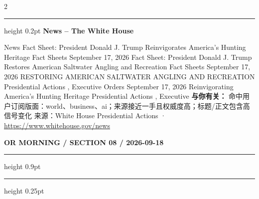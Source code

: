 \documentclass[10.5pt]{ctexart}
\begin{document}
\begin{multicols}{2}
\vspace{2mm}
\hrule height 0.2pt
\vspace{2mm}
{\large\bfseries News – The White House}\par
News Fact Sheet: President Donald J. Trump Reinvigorates America’s Hunting Heritage Fact Sheets September 17, 2026 Fact Sheet: President Donald J. Trump Restores American Saltwater Angling and Recreation Fact Sheets September 17, 2026 RESTORING AMERICAN SALTWATER ANGLING AND RECREATION Presidential Actions , Executive Orders September 17, 2026 Reinvigorating America’s Hunting Heritage Presidential Actions , Executive
\textbf{与你有关：} 命中用户订阅版面：world、business、ai；来源接近一手且权威度高；标题/正文包含高信号变化
{\footnotesize\color{ormuted} 来源：White House Presidential Actions · \url{https://www.whitehouse.gov/news}}
\end{multicols}
\newpage
{\small\bfseries OR MORNING / SECTION 08 / 2026-09-18}
\vspace{2mm}
\hrule height 0.9pt
\vspace{1.5mm}
\hrule height 0.25pt
\vspace{4mm}
\end{document}
